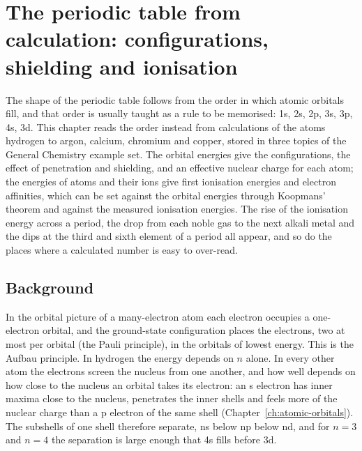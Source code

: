 \chapter{The periodic table from calculation: configurations, shielding and ionisation}
\label{ch:periodic-trends}
\label{ch:configurations}

The shape of the periodic table follows from the order in which atomic orbitals fill, and that order is usually taught as a rule to be memorised: 1s, 2s, 2p, 3s, 3p, 4s, 3d. This chapter reads the order instead from calculations of the atoms hydrogen to argon, calcium, chromium and copper, stored in three topics of the General Chemistry example set. The orbital energies give the configurations, the effect of penetration and shielding, and an effective nuclear charge for each atom; the energies of atoms and their ions give first ionisation energies and electron affinities, which can be set against the orbital energies through Koopmans' theorem and against the measured ionisation energies. The rise of the ionisation energy across a period, the drop from each noble gas to the next alkali metal and the dips at the third and sixth element of a period all appear, and so do the places where a calculated number is easy to over-read.

\section{Background}
In the orbital picture of a many-electron atom each electron occupies a one-electron orbital, and the ground-state configuration places the electrons, two at most per orbital (the Pauli principle), in the orbitals of lowest energy. This is the Aufbau principle. In hydrogen the energy depends on $n$ alone. In every other atom the electrons screen the nucleus from one another, and how well depends on how close to the nucleus an orbital takes its electron: an s electron has inner maxima close to the nucleus, penetrates the inner shells and feels more of the nuclear charge than a p electron of the same shell (Chapter~\ref{ch:atomic-orbitals}). The subshells of one shell therefore separate, ns below np below nd, and for $n = 3$ and $n = 4$ the separation is large enough that 4s fills before 3d.

